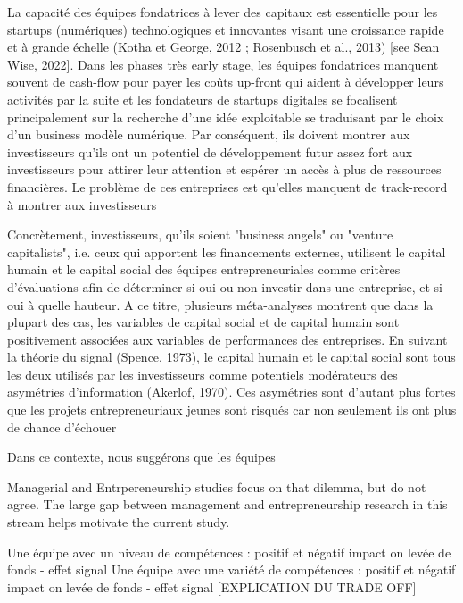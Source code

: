 \documentclass[11pt]{article}
\begin{document}
La capacité des équipes fondatrices à lever des capitaux est essentielle pour les startups (numériques) technologiques et innovantes visant une croissance rapide et à grande échelle (Kotha et George, 2012 ; Rosenbusch et al., 2013) [see Sean Wise, 2022]. Dans les phases très early stage, les équipes fondatrices manquent souvent de cash-flow pour payer les coûts up-front qui aident à développer leurs activités par la suite \citep{ratzinger2018impact} et les fondateurs de startups digitales se focalisent principalement sur la recherche d'une idée exploitable se traduisant par le choix d'un business modèle numérique. Par conséquent, ils doivent montrer aux investisseurs qu'ils ont un potentiel de développement futur assez fort aux investisseurs pour attirer leur attention et espérer un accès à plus de ressources financières. Le problème de ces entreprises est qu'elles manquent de track-record à montrer aux investisseurs

Concrètement, investisseurs, qu'ils soient "business angels" ou "venture capitalists", i.e. ceux qui apportent les financements externes, utilisent le capital humain et le capital social des équipes entrepreneuriales comme critères d'évaluations afin de déterminer si oui ou non investir dans une entreprise, et si oui à quelle hauteur. A ce titre, plusieurs méta-analyses montrent que dans la plupart des cas, les variables de capital social et de capital humain sont positivement associées aux variables de performances des entreprises. En suivant la théorie du signal (Spence, 1973), le capital humain et le capital social sont tous les deux utilisés par les investisseurs comme potentiels modérateurs des asymétries d'information (Akerlof, 1970). Ces asymétries sont d'autant plus fortes que les projets entrepreneuriaux jeunes sont risqués car non seulement ils ont plus de chance d'échouer

Dans ce contexte, nous suggérons que les équipes








Managerial and Entrpereneurship studies focus on that dilemma, but do not agree. The large gap between management and entrepreneurship research in this stream helps motivate the current study.

Une équipe avec un niveau de compétences : positif et négatif impact on levée de fonds - effet signal
Une équipe avec une variété de compétences : positif et négatif impact on levée de fonds - effet signal
[EXPLICATION DU TRADE OFF]
\end{document}

